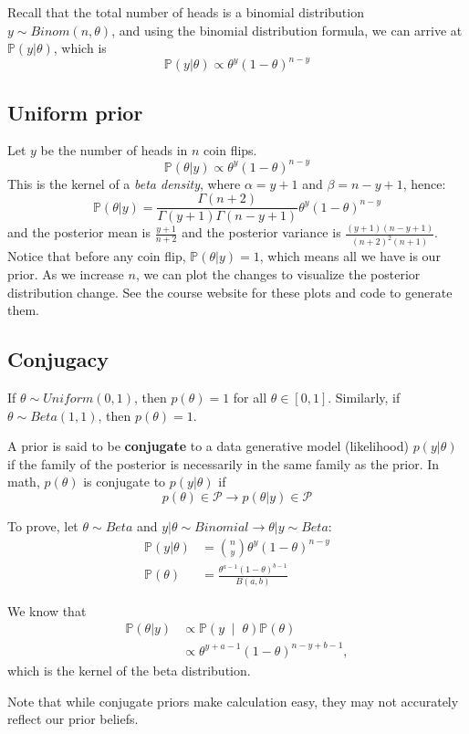 \documentclass[titlepage, 12pt, leqno]{article}
\begin{document}
Recall that the total number of heads is a binomial distribution 
$y \sim Binom(n, \theta)$, and using the binomial distribution formula, we can
arrive at $\mathbb{P}(y|\theta)$, which is
\[
    \mathbb{P}(y|\theta) \propto \theta^{y}(1-\theta)^{n-y}
\]
\subsection{Uniform prior}
Let $y$ be the number of heads in $n$ coin flips.
\[
    \mathbb{P}(\theta|y) \propto \theta^{y}(1-\theta)^{n-y}
\]
This is the kernel of a \textit{beta density}, where $\alpha = y+1$ and 
$\beta = n-y+1$, hence:
\[
\mathbb{P}(\theta|y) = \frac{\Gamma(n+2)}{\Gamma(y+1)\Gamma(n-y+1)}\theta^{y}
(1-\theta)^{n-y}
\]
and the posterior mean is $\frac{y+1}{n+2}$ and the posterior variance is
$\frac{(y+1)(n-y+1)}{(n+2)^{2}(n+1)}$. Notice that before any coin flip, 
$\mathbb{P}(\theta|y)=1$, which means all we have is our prior. As we increase
$n$, we can plot the changes to visualize the posterior distribution change. See
the course website for these plots and code to generate them.

\subsection{Conjugacy}
If $\theta \sim  Uniform(0,1)$, then $p(\theta) = 1$ for all $\theta \in [0,1]$.
Similarly, if $\theta \sim Beta(1,1)$, then $p(\theta) = 1$.
\begin{definition}
    A prior is said to be \textbf{conjugate} to a data generative model 
    (likelihood) $p(y|\theta)$ if the family of the posterior is necessarily in
    the same family as the prior. In math, $p(\theta)$ is conjugate to $p(y|
    \theta)$ if
    \[
        p(\theta) \in \mathcal{P} \rightarrow p(\theta|y) \in \mathcal{P}
    \]
\end{definition}
To prove, let $\theta \sim Beta$ and $y|\theta \sim Binomial \rightarrow 
\theta|y \sim Beta$:
\begin{align*}
    \mathbb{P}(y|\theta) &= \binom{n}{y}\theta^{y}(1-\theta)^{n-y} \\
    \mathbb{P}(\theta) &= \frac{\theta^{a-1}(1-\theta)^{b-1}}{B(a,b)}
\end{align*}

We know that
\begin{align*}
    \mathbb{P}(\theta|y) &\propto \mathbb{P}\left(y \;\middle|\; \theta\right)
    \mathbb{P}(\theta) \\
                         &\propto \theta^{y+a-1}(1-\theta)^{n-y+b-1},
\end{align*}
which is the kernel of the beta distribution.

Note that while conjugate priors make calculation easy, they may not accurately
reflect our prior beliefs.
\end{document}
